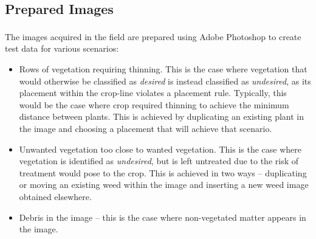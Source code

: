 \documentclass[letterpaper]{article}
\begin{document}
\subsection{Prepared Images}
The images acquired in the field are prepared using Adobe Photoshop\textsuperscript{\textregistered} to create test data for various scenarios:
\begin{itemize}
	\item{Rows of vegetation requiring thinning. This is the case where vegetation that would otherwise be classified as \textit{desired} is instead classified as \textit{undesired}, as its placement within the crop-line violates a placement rule. Typically, this would be the case where crop required thinning to achieve the minimum distance between plants.} This is achieved by duplicating an existing plant in the image and choosing a placement that will achieve that scenario.
	\item{Unwanted vegetation too close to wanted vegetation. This is the case where vegetation is identified as \textit{undesired}, but is left untreated due to the risk of treatment would pose to the crop.} This is achieved in two ways -- duplicating or moving an existing weed within the image and inserting a new weed image obtained elsewhere.
	\item{Debris in the image -- this is the case where non-vegetated matter appears in the image.}
\end{itemize}
\end{document}
